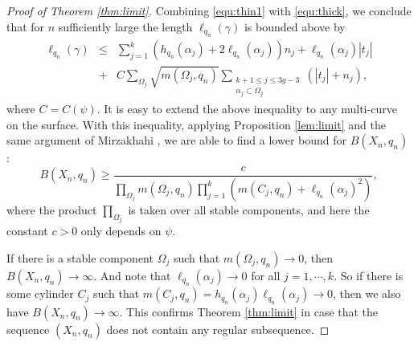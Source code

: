 \documentclass{amsart}
\theoremstyle{plain}
\theoremstyle{definition}
\numberwithin{equation}{section}
\begin{document}
\begin{proof}[Proof of Theorem \ref{thm:limit}]
Combining \eqref{equ:thin1} with \eqref{equ:thick}, 
we conclude that for $n$ sufficiently large the length $\ell_{q_n}(\gamma)$ is bounded above by 
\begin{eqnarray}\label{equ:upperbound}
\ell_{q_n}(\gamma) &\leq&  \sum_{j=1}^k  \left(h_{q_n}(\alpha_j) + 2 \ell_{q_n}(\alpha_j) \right) n_j + \ell_{q_n}(\alpha_j) |t_j| \nonumber \\
&+& C  \sum_{\Omega_j} \sqrt{m(\Omega_j,q_n)}  \sum_{\substack{k+1\leq j \leq 3g-3 \\ \alpha_j \subset \Omega_j}}   (|t_j| + n_j),
\end{eqnarray}
where $C=C(\psi)$. It is easy to extend the above inequality to any multi-curve on the surface. 
With this inequality, applying Proposition
\ref{lem:limit} and the same argument of Mirzakhahi \cite[Proposition 3.6]{Mir2008},
we are able to find a lower bound for $B(X_n, q_n)$:
$$
B(X_n,q_n) \geq \frac{c}{\prod\limits_{\Omega_j} m(\Omega_j, q_n) \prod\limits_{j=1}^k \left( m(C_j, q_n) + \ell_{q_n}(\alpha_j)^2 \right)},
$$
where the product $\prod\limits_{\Omega_j}$ is taken over all stable components,
and here the constant $c>0$ only depends on  $\psi$. 


If there is a stable component $\Omega_j$ such that $m(\Omega_j, q_n)\to 0$,
then $B(X_n, q_n) \to \infty$.  
And note that $\ell_{q_n}(\alpha_j) \to 0$ for all $j=1, \cdots, k$.  
So if there is some cylinder $C_j$ such that $m(C_j, q_n)=h_{q_n}(\alpha_j) \ell_{q_n}(\alpha_j) \to 0$,
then we also have $B(X_n, q_n) \to \infty$.  
This confirms Theorem \ref{thm:limit} in case that the sequence $(X_n,q_n)$
does not contain any regular subsequence. 


\end{proof}
\end{document}
